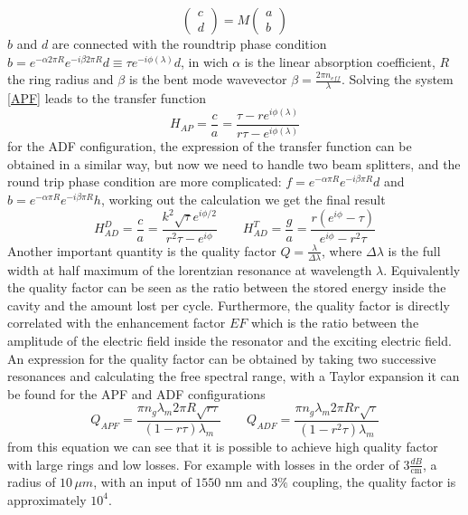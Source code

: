 \begin{equation}\label{APF}\begin{pmatrix}c \\ d \end{pmatrix} = M \begin{pmatrix}a\\b \end{pmatrix}\end{equation}
$b$ and $d$ are connected with the roundtrip phase condition $b = e^{-\alpha 2\pi R} e^{-i\beta 2\pi R}d \equiv\tau e^{-i\phi(\lambda)}d $, in wich $\alpha$ is the linear absorption coefficient, $R$ the ring radius and $\beta$ is the bent mode wavevector $\beta = \frac{2\pi n_{eff}}{\lambda}$. Solving the system \eqref{APF} leads to the transfer function
\begin{equation}H_{AP} = \frac{c}{a} = \frac{\tau - re^{i\phi(\lambda)}}{r\tau -e^{i\phi(\lambda)}}\end{equation}
for the ADF configuration, the expression of the transfer function can be obtained in a similar way, but now we need to handle two beam splitters, and the round trip phase condition are more complicated: $f = e^{-\alpha \pi R} e^{-i\beta \pi R}d$ and $b=e^{-\alpha \pi R} e^{-i\beta \pi R}h$, working out the calculation we get the final result
\begin{equation}H^D_{AD} = \frac{c}{a} = \frac{k^2\sqrt{\tau} e^{i\phi/2}}{r^2\tau -e^{i\phi}}\qquad H^T_{AD} = \frac{g}{a} = \frac{r(e^{i\phi} - \tau)}{e^{i\phi}-r^2\tau} \end{equation}
Another important quantity is the quality factor $Q = \frac{\lambda}{\Delta \lambda}$, where $\Delta \lambda$ is the full width at half maximum of the lorentzian resonance at wavelength $\lambda$. Equivalently the quality factor can be seen as the ratio between the stored energy inside the cavity and the amount lost per cycle. Furthermore, the quality factor is directly correlated with the enhancement factor $EF$ which is the ratio between the amplitude of the electric field inside the resonator and the exciting electric field. An expression for the quality factor can be obtained by taking two successive resonances and calculating the free spectral range, with a Taylor expansion it can be found \cite{thesis:borghi} for the APF and ADF configurations
\begin{equation}
Q_{APF} = \frac{\pi n_g \lambda_m 2\pi R \sqrt{r\tau}}{(1-r\tau)\lambda_m} \qquad Q_{ADF} = \frac{\pi n_g \lambda_m 2\pi R r\sqrt{\tau}}{(1-r^2\tau)\lambda_m}
\end{equation}
from this equation we can see that it is possible to achieve high quality factor with large rings and low losses. For example with losses in the order of $3 \frac{dB}{\text{cm}}$, a radius of $10\, \mu m$, with an input of $1550$ nm and $3\%$ coupling, the quality factor is approximately $10^4$.
